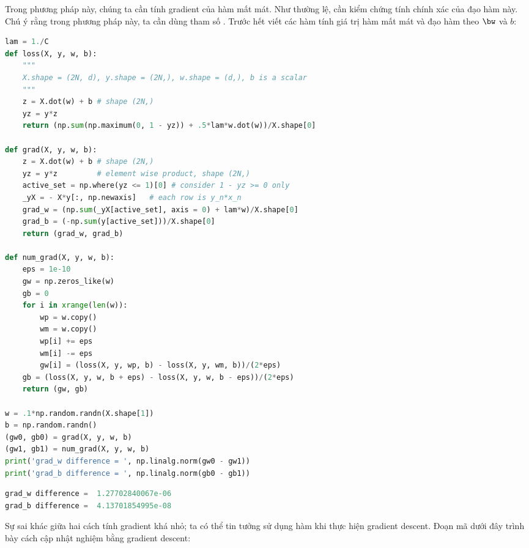 Trong phương pháp này, chúng ta cần tính gradient của hàm mất mát. Như thường lệ, cần kiểm chứng tính chính xác của đạo hàm này. 
 Chú ý rằng trong phương pháp này, ta cần dùng tham số .
Trước hết viết các hàm tính giá trị hàm mất mát và đạo hàm theo $\bw$ và $b$:
\newpage
\begin{lstlisting}[language=Python]
lam = 1./C 
def loss(X, y, w, b): 
    """
    X.shape = (2N, d), y.shape = (2N,), w.shape = (d,), b is a scalar 
    """
    z = X.dot(w) + b # shape (2N,)
    yz = y*z
    return (np.sum(np.maximum(0, 1 - yz)) + .5*lam*w.dot(w))/X.shape[0]

def grad(X, y, w, b):
    z = X.dot(w) + b # shape (2N,)
    yz = y*z         # element wise product, shape (2N,)
    active_set = np.where(yz <= 1)[0] # consider 1 - yz >= 0 only 
    _yX = - X*y[:, np.newaxis]   # each row is y_n*x_n 
    grad_w = (np.sum(_yX[active_set], axis = 0) + lam*w)/X.shape[0]
    grad_b = (-np.sum(y[active_set]))/X.shape[0]
    return (grad_w, grad_b)   

def num_grad(X, y, w, b):
    eps = 1e-10
    gw = np.zeros_like(w)
    gb = 0
    for i in xrange(len(w)):
        wp = w.copy()
        wm = w.copy()
        wp[i] += eps 
        wm[i] -= eps 
        gw[i] = (loss(X, y, wp, b) - loss(X, y, wm, b))/(2*eps)
    gb = (loss(X, y, w, b + eps) - loss(X, y, w, b - eps))/(2*eps)
    return (gw, gb) 

w = .1*np.random.randn(X.shape[1])
b = np.random.randn()
(gw0, gb0) = grad(X, y, w, b)
(gw1, gb1) = num_grad(X, y, w, b)
print('grad_w difference = ', np.linalg.norm(gw0 - gw1))
print('grad_b difference = ', np.linalg.norm(gb0 - gb1))
\end{lstlisting}
\kq
\begin{lstlisting}[language=Python]
grad_w difference =  1.27702840067e-06
grad_b difference =  4.13701854995e-08
\end{lstlisting}
Sự sai khác giữa hai cách tính gradient khá nhỏ; ta có thể tin tưởng sử dụng hàm
 khi thực hiện gradient descent. 
\newpage
Đoạn mã dưới đây trình bày cách cập nhật nghiệm bằng gradient descent:
